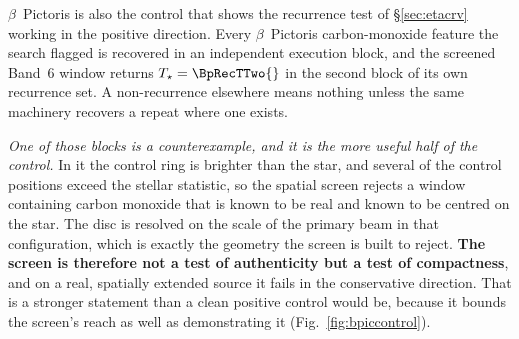 $\beta$~Pictoris is also the control that shows the recurrence test of
\S\ref{sec:etacrv} working in the positive direction. Every
$\beta$~Pictoris carbon-monoxide feature the search flagged is recovered in
an independent execution block, and the screened Band~6 window returns
$T_\star=\BpRecTTwo{}$ in the second block of its own recurrence set. A
non-recurrence elsewhere means nothing unless the same machinery recovers a
repeat where one exists.

\emph{One of those blocks is a counterexample, and it is the more useful
half of the control.} In it the control ring is brighter than the star, and
several of the \NCtrl{} control positions exceed the stellar statistic, so
the spatial screen rejects a window containing carbon monoxide that is known
to be real and known to be centred on the star. The disc is resolved on the
scale of the primary beam in that configuration, which is exactly the
geometry the screen is built to reject. \textbf{The screen is therefore not
a test of authenticity but a test of compactness}, and on a real,
spatially extended source it fails in the conservative direction. That is a
stronger statement than a clean positive control would be, because it bounds
the screen's reach as well as demonstrating it (Fig.~\ref{fig:bpiccontrol}).

